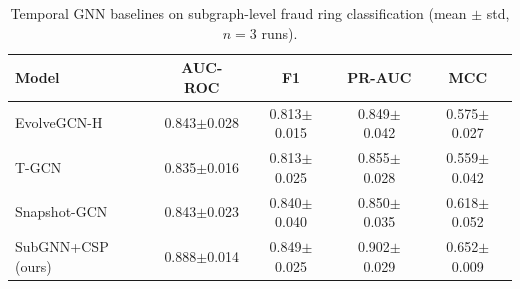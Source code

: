 \begin{table}[t]
\centering
\caption{Temporal GNN baselines on subgraph-level fraud ring classification (mean $\pm$ std, $n=3$ runs).}
\label{tab:temporal_baselines}
\begin{tabular}{lcccc}
\toprule
\textbf{Model} & \textbf{AUC-ROC} & \textbf{F1} & \textbf{PR-AUC} & \textbf{MCC} \\
\midrule
EvolveGCN-H               & 0.843$\pm$0.028 & 0.813$\pm$0.015 & 0.849$\pm$0.042 & 0.575$\pm$0.027 \\
T-GCN                     & 0.835$\pm$0.016 & 0.813$\pm$0.025 & 0.855$\pm$0.028 & 0.559$\pm$0.042 \\
Snapshot-GCN              & 0.843$\pm$0.023 & 0.840$\pm$0.040 & 0.850$\pm$0.035 & 0.618$\pm$0.052 \\
SubGNN+CSP (ours)         & 0.888$\pm$0.014 & 0.849$\pm$0.025 & 0.902$\pm$0.029 & 0.652$\pm$0.009 \\
\bottomrule
\end{tabular}
\end{table}
